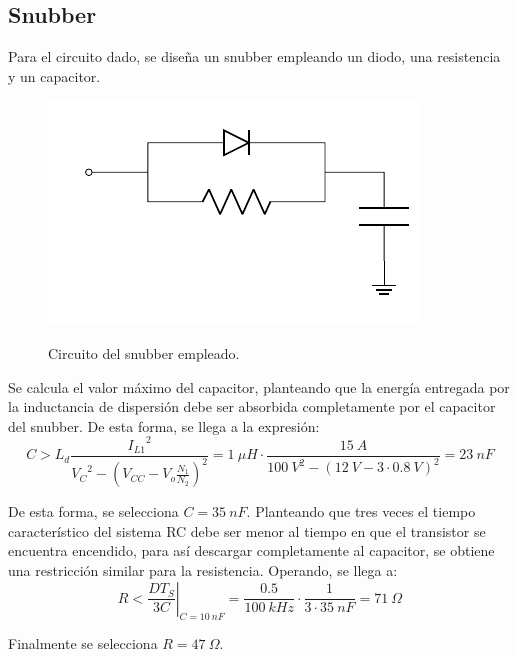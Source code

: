 \subsection{Snubber}
Para el circuito dado, se diseña un snubber empleando un diodo, una resistencia y un capacitor.
\begin{figure}[H]
	\centering
	\includegraphics[width=0.3\linewidth, page = 1]{ImagenesParteII/Snubber.pdf}
	\label{fig:snubber}
	\caption{Circuito del snubber empleado.}
\end{figure}

Se calcula el valor máximo del capacitor, planteando que la energía entregada por la inductancia de dispersión debe ser absorbida completamente por el capacitor del snubber. De esta forma, se llega a la expresión:
\begin{equation}
	C > L_d  \frac{{I_{L1}}^2}{{V_{C}}^2 - \left( V_{CC} - V_{o} \frac{N_1}{N_2} \right)^2 } = 1 \ \mu H \cdot \frac{15 \ A}{{100 \ V}^2 - \left( 12 \ V - 3 \cdot 0.8 \ V \right)^2} = 23 \ nF
\end{equation}

De esta forma, se selecciona $C = 35 \ nF$. Planteando que tres veces el tiempo característico del sistema RC debe ser menor al tiempo en que el transistor se encuentra encendido, para así descargar completamente al capacitor, se obtiene una restricción similar para la resistencia. Operando, se llega a:
\begin{equation}
	R < \left. \frac{DT_S}{3C} \right|_{C = 10 \ nF} = \frac{0.5}{100 \ kHz} \cdot \frac{1}{3 \cdot 35 \ nF} = 71 \ \Omega
\end{equation}

Finalmente se selecciona $R = 47 \ \Omega$.

